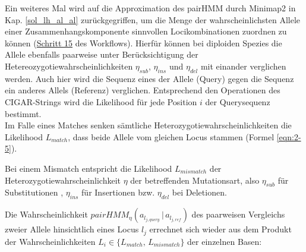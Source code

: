 Ein weiteres Mal wird auf die Approximation des pairHMM durch Minimap2 in Kap. \ref{sol_lh_al_al} zurückgegriffen, um die Menge der wahrscheinlichsten Allele einer Zusammenhangskomponente sinnvollen Locikombinationen zuordnen zu können (\hyperref[step15]{Schritt 15\label{step15txt}} des Workflows). Hierfür können bei diploiden Spezies die Allele ebenfalls paarweise unter Berücksichtigung der Hetereozygotiewahrscheinlichkeiten $\eta_{sub}$, $\eta_{ins}$ und $\eta_{del}$ mit einander verglichen werden. Auch hier wird die Sequenz eines der Allele (Query) gegen die Sequenz ein anderes Allels (Referenz) verglichen. Entsprechend den Operationen des CIGAR-Strings wird die Likelihood für jede Position $i$ der Querysequenz bestimmt. \\

Im Falle eines Matches senken sämtliche Heterozygotiewahrscheinlichkeiten die Likelihood $L_{match}$, dass beide Allele vom gleichen Locus stammen (Formel \eqref{eqn:2-5}).
\vspace{-0.5cm}
\begin{center}
\end{center}
Bei einem Mismatch entspricht die Likelihood $L_{mismatch}$ der Heterozygotiewahrscheinlichkeit $ \eta $ der betreffenden Mutationsart, also $ \eta_{sub} $ für Substitutionen , $ \eta_{ins} $ für Insertionen bzw. $ \eta_{del} $ bei Deletionen. 
\vspace{-0.5cm}
\begin{center}
\end{center}

Die Wahrscheinlichkeit $ pairHMM_{\eta}(a_{l_{j,query}} \, | \, a_{l_{j,ref}}) $ des  paarweisen Vergleichs zweier Allele hinsichtlich eines Locus $l_{j}$ errechnet sich wieder aus dem Produkt der Wahrscheinlichkeiten $L_{i} \in \{L_{match}, \, L_{mismatch}\}$ der einzelnen Basen:
\vspace{-0.5cm}
\begin{center}
\end{center}


